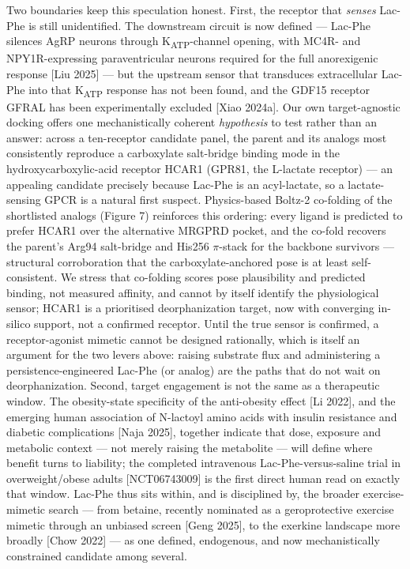\documentclass[11pt]{article}
\begin{document}
Two boundaries keep this speculation honest. First, the receptor that \textit{senses} Lac-Phe is
still unidentified. The downstream circuit is now defined --- Lac-Phe silences AgRP neurons
through K\textsubscript{ATP}-channel opening, with MC4R- and NPY1R-expressing paraventricular neurons
required for the full anorexigenic response [Liu 2025] --- but the upstream sensor that
transduces extracellular Lac-Phe into that K\textsubscript{ATP} response has not been found, and the GDF15
receptor GFRAL has been experimentally excluded [Xiao 2024a]. Our own target-agnostic docking
offers one mechanistically coherent \textit{hypothesis} to test rather than an answer: across a
ten-receptor candidate panel, the parent and its analogs most consistently reproduce a
carboxylate salt-bridge binding mode in the hydroxycarboxylic-acid receptor HCAR1 (GPR81, the
L-lactate receptor) --- an appealing candidate precisely because Lac-Phe is an acyl-lactate, so
a lactate-sensing GPCR is a natural first suspect. Physics-based Boltz-2 co-folding of the
shortlisted analogs (Figure 7) reinforces this ordering: every ligand is predicted to prefer
HCAR1 over the alternative MRGPRD pocket, and the co-fold recovers the parent's Arg94
salt-bridge and His256 $\pi$-stack for the backbone survivors --- structural corroboration that
the carboxylate-anchored pose is at least self-consistent. We stress that co-folding scores
pose plausibility and predicted binding, not measured affinity, and cannot by itself identify
the physiological sensor; HCAR1 is a prioritised deorphanization target, now with converging
in-silico support, not a confirmed receptor. Until the true sensor is confirmed, a receptor-agonist
mimetic cannot be designed rationally, which is itself an argument for the two levers above:
raising substrate flux and administering a persistence-engineered Lac-Phe (or analog) are the
paths that do not wait on deorphanization. Second, target engagement is
not the same as a therapeutic window. The obesity-state specificity of the anti-obesity
effect [Li 2022], and the emerging human association of N-lactoyl amino acids with insulin
resistance and diabetic complications [Naja 2025], together indicate that dose, exposure and
metabolic context --- not merely raising the metabolite --- will define where benefit turns to
liability; the completed intravenous Lac-Phe-versus-saline trial in overweight/obese adults
[NCT06743009] is the first direct human read on exactly that window. Lac-Phe thus sits within,
and is disciplined by, the broader exercise-mimetic search --- from betaine, recently nominated
as a geroprotective exercise mimetic through an unbiased screen [Geng 2025], to the exerkine
landscape more broadly [Chow 2022] --- as one defined, endogenous, and now mechanistically
constrained candidate among several.
\end{document}
